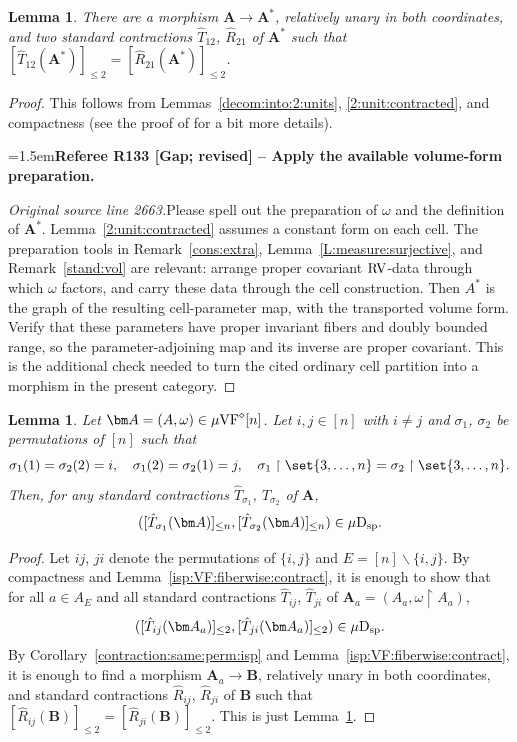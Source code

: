 \documentclass[12pt]{amsart}
\newcommand{\RefereeRemark}[4]{%
  \par\medskip\begingroup\normalfont\small\color{RefereePurple}%
  \emergencystretch=1.5em\noindent\textbf{Referee R#1 [#2] -- #3.}\par\nobreak\noindent #4\par
  \endgroup\medskip
}
\theoremstyle{plain}
\newtheorem{lem}[thm]{Lemma}
\theoremstyle{definition}
\theoremstyle{remark}
\numberwithin{equation}{section}
\theoremstyle{plain}
\newcommand{\VF}{\textup{VF}}
\newcommand{\RV}{\textup{RV}}
\newcommand{\0}{\emptyset}
\newcommand{\rest}{\upharpoonright}
\newcommand{\fun}{\longrightarrow}
\newcommand{\mi}{\smallsetminus}
\newcommand{\mVF}{{\mu}{\VF}}
\newcommand{\dsp}{\textup{D}_{\textup{sp}}}
\newcommand{\mispdb}{\mu \dsp}
\begin{document}
\begin{lem}\label{subset:partitioned:2:unit:contracted}
There are a morphism $\bm A \fun \bm A^*$, relatively unary in both coordinates, and two standard contractions $\hat T_{12}$, $\hat R_{21}$ of $\bm A^*$ such that $[\hat T_{12}(\bm A^*)]_{\leq 2} = [\hat R_{21}(\bm A^*)]_{\leq 2}$.
\end{lem}
\begin{proof}
This follows from  Lemmas~\ref{decom:into:2:units}, \ref{2:unit:contracted}, and compactness (see the proof of \cite[Corollary~5.8]{Yin:int:acvf} for a bit more details).

\RefereeRemark{133}{Gap; revised}{Apply the available volume-form preparation}{%
\textit{Original source line 2663.}\quad Please spell out the preparation of $\omega$ and the definition of $\bm A^*$. Lemma~\ref{2:unit:contracted} assumes a constant form on each cell. The preparation tools in Remark~\ref{cons:extra}, Lemma~\ref{L:measure:surjective}, and Remark~\ref{stand:vol} are relevant: arrange proper covariant $\RV$-data through which $\omega$ factors, and carry these data through the cell construction. Then $A^*$ is the graph of the resulting cell-parameter map, with the transported volume form. Verify that these parameters have proper invariant fibers and doubly bounded range, so the parameter-adjoining map and its inverse are proper covariant. This is the additional check needed to turn the cited ordinary cell partition into a morphism in the present category.
}
\end{proof}

\begin{lem}\label{contraction:perm:pair:isp}
Let $\bm A = (A, \omega) \in \mVF^\diamond[n]$. Let $i, j \in [n]$ with $i \neq j$ and $\sigma_1$, $\sigma_2$ be  permutations of $[n]$ such that
\[
\sigma_1(1) = \sigma_2(2) = i, \quad \sigma_1(2) = \sigma_2(1) = j, \quad \sigma_1
\rest \set{3, \ldots, n} = \sigma_2 \rest \set{3, \ldots, n}.
\]
Then, for any standard contractions $\hat T_{\sigma_1}$, $\hat T_{\sigma_2}$ of $\bm A$,
\[
([\hat T_{\sigma_1}(\bm A)]_{\leq n}, [\hat T_{\sigma_2}(\bm A)]_{\leq n}) \in \mispdb.
\]
\end{lem}
\begin{proof}
Let $ij$, $ji$ denote the permutations of $\{i, j\}$ and $E = [n] \mi \{i, j\}$. By compactness and
Lemma~\ref{isp:VF:fiberwise:contract}, it is enough to show
that for  all $a \in A_E$ and all standard
contractions $\hat T_{ij}$, $\hat T_{ji}$ of $\bm A_a = (A_a, \omega \rest A_a)$,
\[
([\hat T_{ij}(\bm A_a)]_{\leq 2}, [\hat T_{ji}(\bm A_a)]_{\leq 2})
\in \mispdb.
\]
By Corollary~\ref{contraction:same:perm:isp} and Lemma~\ref{isp:VF:fiberwise:contract}, it is enough to find a morphism $\bm A_a \fun \bm B$, relatively unary in both coordinates, and  standard contractions $\hat R_{ij}$, $\hat R_{ji}$ of $\bm B$ such that $[\hat R_{ij}(\bm B)]_{\leq 2} = [\hat R_{ji}(\bm B)]_{\leq 2}$. This is just Lemma~\ref{subset:partitioned:2:unit:contracted}.
\end{proof}
\end{document}

